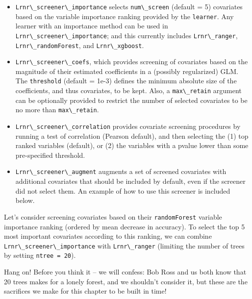\documentclass[
  12pt, krantz2,
]{book}
\newcommand{\passthrough}[1]{#1}
\providecommand{\tightlist}{%
  \setlength{\itemsep}{0pt}\setlength{\parskip}{0pt}}
\theoremstyle{definition}
\theoremstyle{definition}
\theoremstyle{definition}
\newcommand{\1}{\mathbbm{1}}
\begin{document}
\begin{itemize}
\tightlist
\item
  \passthrough{\lstinline!Lrnr\_screener\_importance!} selects \passthrough{\lstinline!num\_screen!} (default = 5) covariates
  based on the variable importance ranking provided by the \passthrough{\lstinline!learner!}. Any
  learner with an importance method can be used in \passthrough{\lstinline!Lrnr\_screener\_importance!};
  and this currently includes \passthrough{\lstinline!Lrnr\_ranger!}, \passthrough{\lstinline!Lrnr\_randomForest!}, and
  \passthrough{\lstinline!Lrnr\_xgboost!}.
\item
  \passthrough{\lstinline!Lrnr\_screener\_coefs!}, which provides screening of covariates based on the
  magnitude of their estimated coefficients in a (possibly regularized) GLM.
  The \passthrough{\lstinline!threshold!} (default = 1e-3) defines the minimum absolute size of the
  coefficients, and thus covariates, to be kept. Also, a \passthrough{\lstinline!max\_retain!} argument
  can be optionally provided to restrict the number of selected covariates to be
  no more than \passthrough{\lstinline!max\_retain!}.
\item
  \passthrough{\lstinline!Lrnr\_screener\_correlation!} provides covariate screening procedures by
  running a test of correlation (Pearson default), and then selecting the (1)
  top ranked variables (default), or (2) the variables with a pvalue lower than
  some pre-specified threshold.
\item
  \passthrough{\lstinline!Lrnr\_screener\_augment!} augments a set of screened covariates with additional
  covariates that should be included by default, even if the screener did not
  select them. An example of how to use this screener is included below.
\end{itemize}

Let's consider screening covariates based on their \passthrough{\lstinline!randomForest!} variable
importance ranking (ordered by mean decrease in accuracy). To select the top
5 most important covariates according to this ranking, we can combine
\passthrough{\lstinline!Lrnr\_screener\_importance!} with \passthrough{\lstinline!Lrnr\_ranger!} (limiting the number of trees by
setting \passthrough{\lstinline!ntree = 20!}).

Hang on! Before you think it -- we will confess: Bob Ross and us both know that
20 trees makes for a lonely forest, and we shouldn't consider it, but these are
the sacrifices we make for this chapter to be built in time!
\end{document}
